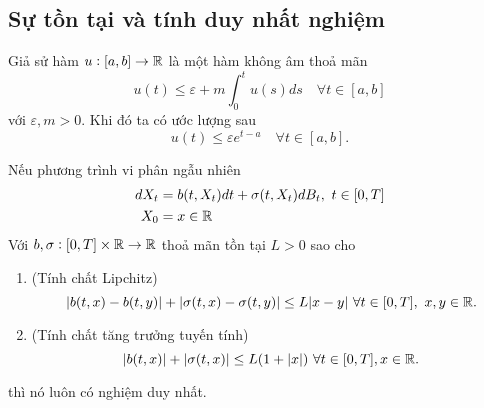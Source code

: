 \subsection{Sự tồn tại và tính duy nhất nghiệm}
\begin{lem}[Gronwall]
    Giả sử hàm $u: [a,b] \to \mathbb{R}$ là một hàm không âm thoả mãn 
    \[u(t) \leq \varepsilon + m\int_0^tu(s)ds\quad \forall t \in [a,b]\]
    với $\varepsilon, m >0$. Khi đó ta có ước lượng sau
    \[u(t) \leq \varepsilon e^{t-a} \quad \forall t\in [a,b].\]
\end{lem}
\begin{thm}
    Nếu phương trình vi phân ngẫu nhiên
    \begin{align*}
        dX_t &= b(t,X_t)dt + \sigma(t,X_t)dB_t,~t \in [0,T]\\
        X_0 &= x \in \mathbb{R}
    \end{align*}
    Với $b, \sigma: [0,T]\times \mathbb{R} \to \mathbb{R}$ thoả mãn tồn tại $L  > 0$ sao cho
    \begin{enumerate}
        \item (Tính chất Lipchitz)
        \[|b(t,x)-b(t,y)|+ |\sigma(t,x)-\sigma(t,y)| \leq L|x-y|~\forall t\in [0,T],~x,y\in \mathbb{R}.\]
        \item (Tính chất tăng trưởng tuyến tính)
        \[|b(t,x)| + |\sigma(t,x)| \leq L(1+|x|) ~\forall t \in [0,T],x\in \mathbb{R}.\]
    \end{enumerate}
    thì nó luôn có nghiệm duy nhất.
\end{thm}
